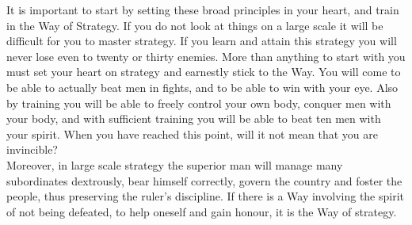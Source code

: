 It is important to start by setting these broad principles in your heart, and train in the Way of Strategy. If you do not look at things on a large scale it will be difficult for you to master strategy. If you learn and attain this strategy you will never lose even to twenty or thirty enemies. More than anything to start with you must set your heart on strategy and earnestly stick to the Way. You will come to be able to actually beat men in fights, and to be able to win with your eye. Also by training you will be able to freely control your own body, conquer men with your body, and with sufficient training you will be able to beat ten men with your spirit. When you have reached this point, will it not mean that you are invincible?\\

Moreover, in large scale strategy the superior man will manage many subordinates dextrously, bear himself correctly, govern the country and foster the people, thus preserving the ruler's discipline. If there is a Way involving the spirit of not being defeated, to help oneself and gain honour, it is the Way of strategy.
